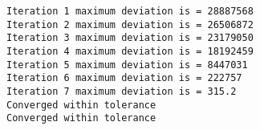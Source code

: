 \documentclass[
  letterpaper,
  DIV=11,
  numbers=noendperiod]{scrartcl}
\newenvironment{Shaded}{\begin{snugshade}}{\end{snugshade}}
\newcommand{\AttributeTok}[1]{\textcolor[rgb]{0.40,0.45,0.13}{#1}}
\newcommand{\DecValTok}[1]{\textcolor[rgb]{0.68,0.00,0.00}{#1}}
\newcommand{\FunctionTok}[1]{\textcolor[rgb]{0.28,0.35,0.67}{#1}}
\newcommand{\NormalTok}[1]{\textcolor[rgb]{0.00,0.23,0.31}{#1}}
\newcommand{\OtherTok}[1]{\textcolor[rgb]{0.00,0.23,0.31}{#1}}
\newcommand{\SpecialCharTok}[1]{\textcolor[rgb]{0.37,0.37,0.37}{#1}}
\newcommand{\StringTok}[1]{\textcolor[rgb]{0.13,0.47,0.30}{#1}}
\begin{document}
\begin{verbatim}
Iteration 1 maximum deviation is = 28887568 
Iteration 2 maximum deviation is = 26506872 
Iteration 3 maximum deviation is = 23179050 
Iteration 4 maximum deviation is = 18192459 
Iteration 5 maximum deviation is = 8447031 
Iteration 6 maximum deviation is = 222757 
Iteration 7 maximum deviation is = 315.2 
Converged within tolerance 
Converged within tolerance 
\end{verbatim}

\begin{Shaded}
\end{Shaded}
\end{document}
